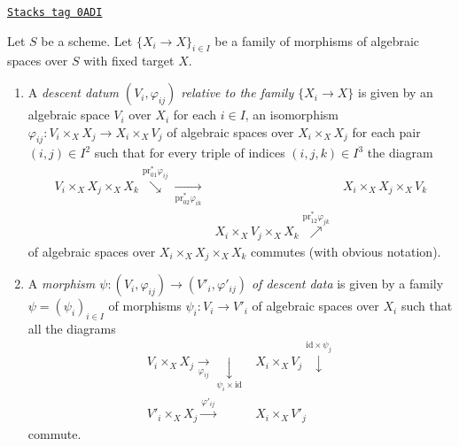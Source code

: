 \begin{definition}
\label{spaces-descent-definition-descent-datum-for-family-of-morphisms}
\href{https://stacks.math.columbia.edu/tag/0ADI}{\texttt{Stacks tag 0ADI}}

Let $S$ be a scheme.
Let $\{X_i \to X\}_{i \in I}$ be a family of morphisms
of algebraic spaces over $S$ with fixed target $X$.
\begin{enumerate}
\item A {\it descent datum $(V_i, \varphi_{ij})$ relative to the
family $\{X_i \to X\}$} is given by an algebraic space $V_i$ over $X_i$
for each $i \in I$, an isomorphism
$\varphi_{ij} : V_i \times_X X_j \to X_i \times_X V_j$
of algebraic spaces over $X_i \times_X X_j$ for each pair $(i, j) \in I^2$
such that for every triple of indices $(i, j, k) \in I^3$
the diagram
$$
\begin{array}{ccc}V_i \times_X X_j \times_X X_k
\overset{\text{pr}_{01}^*\varphi_{ij}}{\searrow}\underset{\text{pr}_{02}^*\varphi_{ik}}{\longrightarrow} &  & X_i \times_X X_j \times_X V_k \\  & X_i \times_X V_j \times_X X_k
\overset{\text{pr}_{12}^*\varphi_{jk}}{\nearrow} & \end{array}
$$
of algebraic spaces over $X_i \times_X X_j \times_X X_k$ commutes
(with obvious notation).
\item A {\it morphism
$\psi : (V_i, \varphi_{ij}) \to (V'_i, \varphi'_{ij})$
of descent data} is given by a family $\psi = (\psi_i)_{i \in I}$
of morphisms $\psi_i : V_i \to V'_i$ of algebraic spaces over $X_i$
such that all the diagrams
$$
\begin{array}{cc}V_i \times_X X_j \underset{\varphi_{ij}}{\longrightarrow}\underset{\psi_i \times \text{id}}{\downarrow} & X_i \times_X V_j \overset{\text{id} \times \psi_j}{\downarrow} \\ V'_i \times_X X_j \overset{\varphi'_{ij}}{\longrightarrow} & X_i \times_X V'_j\end{array}
$$
commute.
\end{enumerate}
\end{definition}

